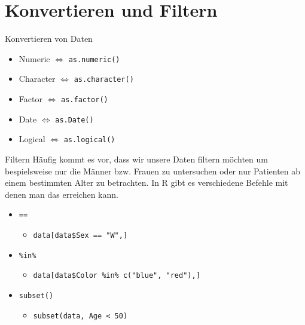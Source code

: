 \documentclass[aspectratio = 169]{chariteBeamer}
\begin{document}
\section{Konvertieren und Filtern}
\begin{frame}[fragile]{Konvertieren von Daten}
	\begin{itemize}
		\item Numeric $\Leftrightarrow$ \verb+as.numeric()+
		\item Character $\Leftrightarrow$ \verb+as.character()+
		\item Factor $\Leftrightarrow$ \verb+as.factor()+
		\item Date $\Leftrightarrow$ \verb+as.Date()+
		\item Logical $\Leftrightarrow$ \verb+as.logical()+
	\end{itemize}
\end{frame}



\begin{frame}[fragile]{Filtern}
Häufig kommt es vor, dass wir unsere Daten filtern möchten um bespielsweise nur die Männer bzw. Frauen zu untersuchen oder nur Patienten ab einem bestimmten Alter zu betrachten. In R gibt es verschiedene Befehle mit denen man das erreichen kann.
	\begin{itemize}
		\item  \verb+==+
		\begin{itemize}
			\item  \verb+data[data$Sex == "W",]+
		\end{itemize}
		\item  \verb+%in%+
		\begin{itemize}
			\item  \verb+data[data$Color %in% c("blue", "red"),]+
		\end{itemize}
		\item  \verb+subset()+
		\begin{itemize}
			\item  \verb+subset(data, Age < 50)+
		\end{itemize}
	\end{itemize}
\end{frame}
\end{document}
